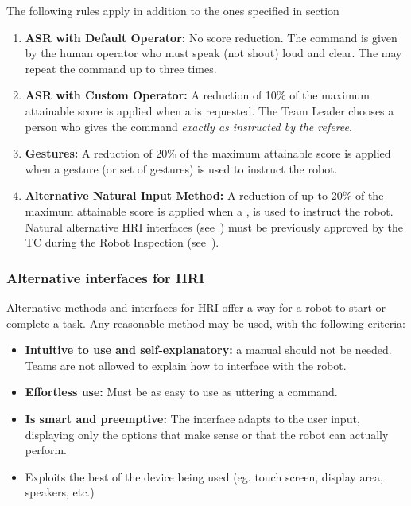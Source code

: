The following rules apply in addition to the ones specified in section 
\begin{enumerate}
	\item \textbf{ASR with Default Operator:} No score reduction.
	The command is given by the human operator who must speak (not shout) loud and clear.
	The  may repeat the command up to three times.

	\item \textbf{ASR with Custom Operator:} A reduction of 10\% of the maximum attainable score is applied when a  is requested.
	The Team Leader chooses a person who gives the command \emph{exactly as instructed by the referee}.

	\item \textbf{Gestures:} A reduction of 20\% of the maximum attainable score is applied when a gesture (or set of gestures) is used to instruct the robot.

	\item \textbf{Alternative Natural Input Method:} A reduction of up to 20\% of the maximum attainable score is applied when a , is used to instruct the robot.
	Natural alternative HRI interfaces (see~) must be previously approved by the TC during the Robot Inspection (see~).
\end{enumerate}


\subsubsection{Alternative interfaces for HRI}\label{rule:asralternative}
Alternative methods and interfaces for HRI offer a way for a robot to start or complete a task.
Any reasonable method may be used, with the following criteria:
\begin{itemize}
	\item \textbf{Intuitive to use and self-explanatory:} a manual should not be needed. Teams are not allowed to explain how to interface with the robot. %

	\item \textbf{Effortless use:} Must be as easy to use as uttering a command. %

	\item \textbf{Is smart and preemptive:} The interface adapts to the user input, displaying only the options that make sense or that the robot can actually perform.

	\item Exploits the best of the device being used (eg. touch screen, display area, speakers, etc.)
\end{itemize}

